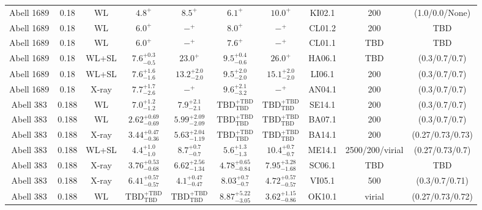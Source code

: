 \begin{table}
\begin{tabular}{cccccccccc}
Abell 1689 & 0.18 & WL & ${4.8}^{+}_{}$ & ${8.5}^{+}_{}$ & ${6.1}^{+}_{}$ & ${10.0}^{+}_{}$ & KI02.1 & 200 & (1.0/0.0/None) \\
Abell 1689 & 0.18 & WL & ${6.0}^{+}_{}$ & ${-}^{+}_{}$ & ${8.0}^{+}_{}$ & ${-}^{+}_{}$ & CL01.2 & 200 & TBD \\
Abell 1689 & 0.18 & WL & ${6.0}^{+}_{}$ & ${-}^{+}_{}$ & ${7.6}^{+}_{}$ & ${-}^{+}_{}$ & CL01.1 & TBD & TBD \\
Abell 1689 & 0.18 & WL+SL & ${7.6}^{+0.3}_{-0.5}$ & ${23.0}^{+}_{}$ & ${9.5}^{+0.4}_{-0.6}$ & ${26.0}^{+}_{}$ & HA06.1 & TBD & (0.3/0.7/0.7) \\
Abell 1689 & 0.18 & WL+SL & ${7.6}^{+1.6}_{-1.6}$ & ${13.2}^{+2.0}_{-2.0}$ & ${9.5}^{+2.0}_{-2.0}$ & ${15.1}^{+2.0}_{-2.0}$ & LI06.1 & 200 & (0.3/0.7/0.7) \\
Abell 1689 & 0.18 & X-ray & ${7.7}^{+1.7}_{-2.6}$ & ${-}^{+}_{}$ & ${9.6}^{+2.1}_{-3.2}$ & ${-}^{+}_{}$ & AN04.1 & 200 & (0.3/0.7/0.7) \\
Abell 383 & 0.188 & WL & ${7.0}^{+1.2}_{-1.2}$ & ${7.9}^{+2.1}_{-2.1}$ & ${\mathrm{TBD}}^{+\mathrm{TBD}}_{\mathrm{TBD}}$ & ${\mathrm{TBD}}^{+\mathrm{TBD}}_{\mathrm{TBD}}$ & SE14.1 & 200 & (0.3/0.7/0.7) \\
Abell 383 & 0.188 & WL & ${2.62}^{+0.69}_{-0.69}$ & ${5.99}^{+2.09}_{-2.09}$ & ${\mathrm{TBD}}^{+\mathrm{TBD}}_{\mathrm{TBD}}$ & ${\mathrm{TBD}}^{+\mathrm{TBD}}_{\mathrm{TBD}}$ & BA07.1 & 200 & (0.3/0.7/0.7) \\
Abell 383 & 0.188 & X-ray & ${3.44}^{+0.47}_{-0.36}$ & ${5.63}^{+2.04}_{-1.19}$ & ${\mathrm{TBD}}^{+\mathrm{TBD}}_{\mathrm{TBD}}$ & ${\mathrm{TBD}}^{+\mathrm{TBD}}_{\mathrm{TBD}}$ & BA14.1 & 200 & (0.27/0.73/0.73) \\
Abell 383 & 0.188 & WL+SL & ${4.4}^{+1.0}_{-1.0}$ & ${8.7}^{+0.7}_{-0.7}$ & ${5.6}^{+1.3}_{-1.3}$ & ${10.4}^{+0.7}_{-0.7}$ & ME14.1 & 2500/200/virial & (0.27/0.73/0.7) \\
Abell 383 & 0.188 & X-ray & ${3.76}^{+0.53}_{-0.68}$ & ${6.62}^{+2.56}_{-1.34}$ & ${4.78}^{+0.65}_{-0.84}$ & ${7.95}^{+3.28}_{-1.68}$ & SC06.1 & TBD & TBD \\
Abell 383 & 0.188 & X-ray & ${6.41}^{+0.57}_{-0.57}$ & ${4.1}^{+0.47}_{-0.47}$ & ${8.03}^{+0.7}_{-0.7}$ & ${4.72}^{+0.57}_{-0.57}$ & VI05.1 & 500 & (0.3/0.7/0.71) \\
Abell 383 & 0.188 & WL & ${\mathrm{TBD}}^{+\mathrm{TBD}}_{\mathrm{TBD}}$ & ${\mathrm{TBD}}^{+\mathrm{TBD}}_{\mathrm{TBD}}$ & ${8.87}^{+5.22}_{-3.05}$ & ${3.62}^{+1.15}_{-0.86}$ & OK10.1 & virial & (0.27/0.73/0.72) \\

\end{tabular}
\end{table}
